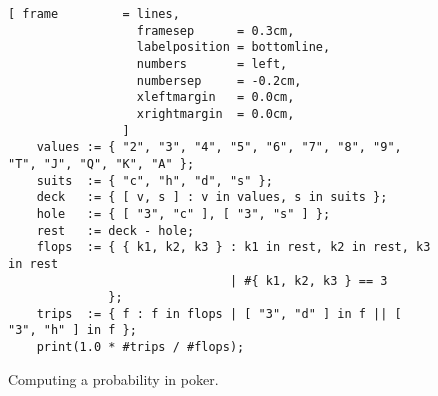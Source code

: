 \begin{figure}[!ht]
\centering
\begin{Verbatim}[ frame         = lines, 
                  framesep      = 0.3cm, 
                  labelposition = bottomline,
                  numbers       = left,
                  numbersep     = -0.2cm,
                  xleftmargin   = 0.0cm,
                  xrightmargin  = 0.0cm,
                ]
    values := { "2", "3", "4", "5", "6", "7", "8", "9", "T", "J", "Q", "K", "A" }; 
    suits  := { "c", "h", "d", "s" };
    deck   := { [ v, s ] : v in values, s in suits };
    hole   := { [ "3", "c" ], [ "3", "s" ] };
    rest   := deck - hole;
    flops  := { { k1, k2, k3 } : k1 in rest, k2 in rest, k3 in rest 
                               | #{ k1, k2, k3 } == 3 
              };
    trips  := { f : f in flops | [ "3", "d" ] in f || [ "3", "h" ] in f };
    print(1.0 * #trips / #flops);
\end{Verbatim}
\vspace*{-0.3cm}
\caption{Computing a probability in poker.}
\label{fig:poker-triple.stlx}
\end{figure}

